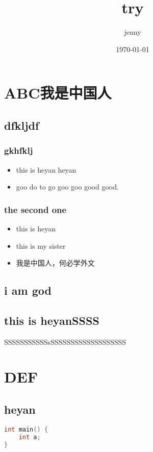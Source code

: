 \documentclass[11pt]{article}
\author{jenny}
\date{\today}
\title{try}
\begin{document}
\maketitle
\tableofcontents


\section{ABC我是中国人}
\label{sec-1}
\subsection{dfkljdf}
\label{sec-1-1}
\subsubsection{gkhfklj}
\label{sec-1-1-1}
\begin{itemize}
\item this is heyan heyan
\item goo do to go goo goo good good.
\end{itemize}

\subsubsection{the second one}
\label{sec-1-1-2}
\begin{itemize}
\item this is heyan
\item this is my sister
\item 我是中国人，何必学外文
\end{itemize}

\subsection{i am god}
\label{sec-1-2}
\subsection{this is heyanSSSS}
\label{sec-1-3}
SSSSSSSSSSSsSSSSSSSSSSSSSSSSSSS

\section{DEF}
\label{sec-2}
\subsection{heyan}
\label{sec-2-1}
\begin{lstlisting}[language=c++]
int main() {
    int a;
}
\end{lstlisting}
\end{document}
